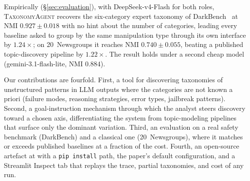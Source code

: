 Empirically (\S\ref{sec:evaluation}), with DeepSeek-v4-Flash for both
roles, \textsc{TaxonomyAgent} recovers the six-category expert taxonomy
of DarkBench~\citep{kran2025darkbench} at NMI $0.927 \pm 0.018$ with no
hint about the number of categories, leading every baseline asked to
group by the same manipulation type through its own interface by
$1.24\times$; on 20~Newsgroups it reaches NMI $0.740 \pm 0.055$, beating
a published topic-discovery pipeline by $1.22\times$. The result holds
under a second cheap model (gemini-3.1-flash-lite, NMI $0.884$).

Our contributions are fourfold. First, a tool for discovering
taxonomies of unstructured patterns in LLM outputs where the categories
are not known a priori (failure modes, reasoning strategies, error
types, jailbreak patterns). Second, a goal-instruction mechanism through
which the analyst steers discovery toward a chosen axis, differentiating
the system from topic-modeling pipelines that surface only the dominant
variation. Third, an evaluation on a real safety benchmark (DarkBench)
and a classical one (20~Newsgroups), where it matches or exceeds
published baselines at a fraction of the cost. Fourth, an open-source
artefact at \repourl{} with a \texttt{pip install} path, the paper's
default configuration, and a Streamlit Inspect tab that replays the
trace, partial taxonomies, and cost of any run.
